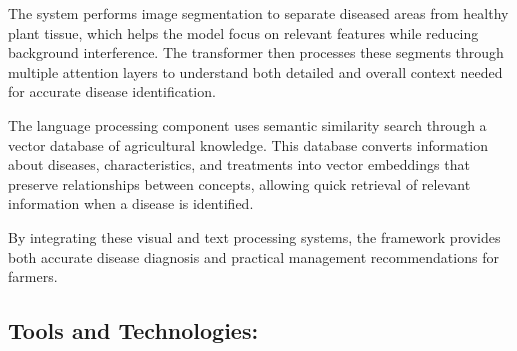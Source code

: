 The system performs image segmentation to separate diseased areas from healthy plant tissue, which helps the model focus on relevant features while reducing background interference. The transformer then processes these segments through multiple attention layers to understand both detailed and overall context needed for accurate disease identification.

The language processing component uses semantic similarity search through a vector database of agricultural knowledge. This database converts information about diseases, characteristics, and treatments into vector embeddings that preserve relationships between concepts, allowing quick retrieval of relevant information when a disease is identified.

By integrating these visual and text processing systems, the framework provides both accurate disease diagnosis and practical management recommendations for farmers.

\subsection{Tools and Technologies:} 

